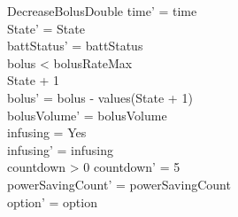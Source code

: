 \begin{schema}{DecreaseBolusDouble}
	time' = time\\ State' = State\\
	battStatus' = battStatus\\
	bolus < bolusRateMax\\
	State + 1 \\
	bolus' = bolus - values(State + 1)\\
	bolusVolume' = bolusVolume\\
	infusing = Yes\\
	infusing' = infusing\\
	countdown > 0 \land countdown' = 5\\
	powerSavingCount' = powerSavingCount\\ option' = option\\
\end{schema}

